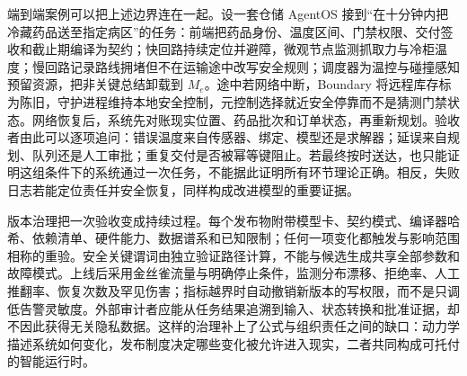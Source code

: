 端到端案例可以把上述边界连在一起。设一套仓储 AgentOS 接到“在十分钟内把冷藏药品送至指定病区”的任务：前端把药品身份、温度区间、门禁权限、交付签收和截止期编译为契约；快回路持续定位并避障，微观节点监测抓取力与冷柜温度；慢回路记录路线拥堵但不在运输途中改写安全规则；调度器为温控与碰撞感知预留资源，把非关键总结卸载到 $M_e$。途中若网络中断，Boundary 将远程库存标为陈旧，守护进程维持本地安全控制，元控制选择就近安全停靠而不是猜测门禁状态。网络恢复后，系统先对账现实位置、药品批次和订单状态，再重新规划。验收者由此可以逐项追问：错误温度来自传感器、绑定、模型还是求解器；延误来自规划、队列还是人工审批；重复交付是否被幂等键阻止。若最终按时送达，也只能证明这组条件下的系统通过一次任务，不能据此证明所有环节理论正确。相反，失败日志若能定位责任并安全恢复，同样构成改进模型的重要证据。

版本治理把一次验收变成持续过程。每个发布物附带模型卡、契约模式、编译器哈希、依赖清单、硬件能力、数据谱系和已知限制；任何一项变化都触发与影响范围相称的重验。安全关键谓词由独立验证路径计算，不能与候选生成共享全部参数和故障模式。上线后采用金丝雀流量与明确停止条件，监测分布漂移、拒绝率、人工推翻率、恢复次数及罕见伤害；指标越界时自动撤销新版本的写权限，而不是只调低告警灵敏度。外部审计者应能从任务结果追溯到输入、状态转换和批准证据，却不因此获得无关隐私数据。这样的治理补上了公式与组织责任之间的缺口：动力学描述系统如何变化，发布制度决定哪些变化被允许进入现实，二者共同构成可托付的智能运行时。
